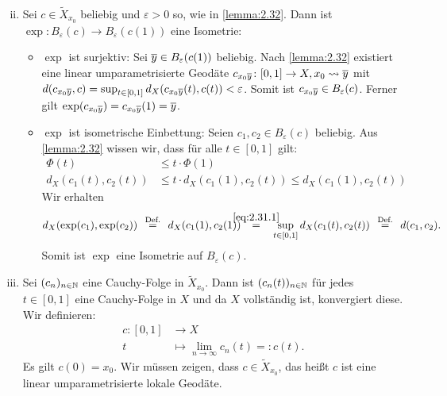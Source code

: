 \begin{beweis}
	\mbox{} \\[-.9cm]
	\begin{enumerate}[(i)]
		\setcounter{enumi}{1}
		\item Sei $c \in \tilde{X}_{x_0}$ beliebig und $\varepsilon > 0$ so, wie in \autoref{lemma:2.32}.
		Dann ist $\exp\colon B_\varepsilon(c) \rightarrow B_\varepsilon(c(1))$ eine Isometrie:
		\begin{itemize}
			\item $\exp$ ist surjektiv:
			Sei $\overline{y} \in B_\varepsilon(c(1))$ beliebig.
			Nach \autoref{lemma:2.32} existiert eine linear umparametrisierte Geodäte $c_{x_0 \overline{y}}\colon [0,1] \rightarrow X, x_0 \rightsquigarrow \overline{y}$ mit $d(c_{x_0 \overline{y}},c) = \sup_{t \in [0,1]} d_X(c_{x_0 \overline{y}}(t),c(t)) < \varepsilon$.
			Somit ist $c_{x_0 \overline{y}} \in B_\varepsilon(c)$.
			Ferner gilt $\exp(c_{x_0 \overline{y}}) = c_{x_0 \overline{y}}(1) = \overline{y}$. 
			\item $\exp$ ist isometrische Einbettung:
			Seien $c_1,c_2 \in B_\varepsilon(c)$ beliebig.
			Aus \autoref{lemma:2.32} wissen wir, dass für alle $t \in [0,1]$ gilt:
			\begin{align}
				\Phi(t) &\leq t \cdot \Phi(1) \\
				d_X(c_1(t),c_2(t)) &\leq t \cdot d_X(c_1(1),c_2(t)) \leq d_X(c_1(1),c_2(t)) \label{eq:2.31.1}
			\end{align}
			Wir erhalten
			\[
				d_X(\exp(c_1),\exp(c_2)) \stack{\text{Def.}}{=} d_X(c_1(1),c_2(1))  \stack{\eqref{eq:2.31.1}}{=} \sup_{t \in [0,1]} d_X(c_1(t),c_2(t)) \stack{\text{Def.}}{=} d(c_1,c_2).
			\]
			Somit ist $\exp$ eine Isometrie auf $B_\varepsilon(c)$.
		\end{itemize}
		\item Sei $(c_n)_{n \in \mathbb{N}}$ eine Cauchy-Folge in $\tilde{X}_{x_0}$.
		Dann ist $(c_n(t))_{n \in \mathbb{N}}$ für jedes $t \in [0,1]$ eine Cauchy-Folge in $X$ und da $X$ vollständig ist, konvergiert diese.
		Wir definieren:
		\begin{align*}
			c \colon [0,1] &\longrightarrow X \\
			t &\longmapsto \lim\limits_{n \rightarrow \infty} c_n(t) =: c(t).
		\end{align*}
		Es gilt $c(0) = x_0$.
		Wir müssen zeigen, dass $c \in \tilde{X}_{x_0}$, das heißt $c$ ist eine linear umparametrisierte lokale Geodäte.
		

\end{enumerate}
\end{beweis}
